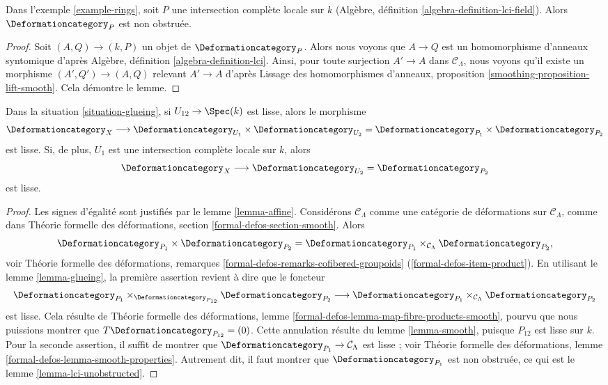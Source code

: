 \begin{lemma}
\label{lemma-lci-unobstructed}
Dans l'exemple \ref{example-rings}, soit $P$ une intersection complète
locale sur $k$ (Algèbre, définition \ref{algebra-definition-lci-field}).
Alors $\Deformationcategory_P$ est non obstruée.
\end{lemma}

\begin{proof}
Soit $(A, Q) \to (k, P)$ un objet de $\Deformationcategory_P$.
Alors nous voyons que $A \to Q$ est un homomorphisme d'anneaux syntomique d'après
Algèbre, définition \ref{algebra-definition-lci}.
Ainsi, pour toute surjection $A' \to A$ dans $\mathcal{C}_\Lambda$,
nous voyons qu'il existe un morphisme $(A', Q') \to (A, Q)$
relevant $A' \to A$ d'après
Lissage des homomorphismes d'anneaux, proposition \ref{smoothing-proposition-lift-smooth}.
Cela démontre le lemme.
\end{proof}

\begin{lemma}
\label{lemma-glueing-smooth}
Dans la situation \ref{situation-glueing}, si $U_{12} \to \Spec(k)$ est lisse,
alors le morphisme
$$
\Deformationcategory_X
\longrightarrow
\Deformationcategory_{U_1} \times \Deformationcategory_{U_2} =
\Deformationcategory_{P_1} \times \Deformationcategory_{P_2}
$$
est lisse. Si, de plus,
$U_1$ est une intersection complète locale sur $k$, alors
$$
\Deformationcategory_X
\longrightarrow
\Deformationcategory_{U_2} = \Deformationcategory_{P_2}
$$
est lisse.
\end{lemma}

\begin{proof}
Les signes d'égalité sont justifiés par le lemme \ref{lemma-affine}.
Considérons $\mathcal{C}_\Lambda$ comme une catégorie de
déformations sur $\mathcal{C}_\Lambda$, comme dans
Théorie formelle des déformations, section \ref{formal-defos-section-smooth}.
Alors
$$
\Deformationcategory_{P_1} \times \Deformationcategory_{P_2} =
\Deformationcategory_{P_1}
\times_{\mathcal{C}_\Lambda}
\Deformationcategory_{P_2},
$$
voir Théorie formelle des déformations, remarques
\ref{formal-defos-remarks-cofibered-groupoids}
(\ref{formal-defos-item-product}).
En utilisant le
lemme \ref{lemma-glueing},
la première assertion revient à dire que le foncteur
$$
\Deformationcategory_{P_1}
\times_{\Deformationcategory_{P_{12}}}
\Deformationcategory_{P_2}
\longrightarrow
\Deformationcategory_{P_1}
\times_{\mathcal{C}_\Lambda}
\Deformationcategory_{P_2}
$$
est lisse. Cela résulte de Théorie formelle des déformations, lemme
\ref{formal-defos-lemma-map-fibre-products-smooth}, pourvu que
nous puissions montrer que $T\Deformationcategory_{P_{12}} = (0)$.
Cette annulation résulte du lemme \ref{lemma-smooth},
puisque $P_{12}$ est lisse sur $k$.
Pour la seconde assertion, il suffit de montrer que
$\Deformationcategory_{P_1} \to \mathcal{C}_\Lambda$
est lisse ; voir Théorie formelle des déformations, lemme
\ref{formal-defos-lemma-smooth-properties}.
Autrement dit, il faut montrer que $\Deformationcategory_{P_1}$
est non obstruée, ce qui est le lemme \ref{lemma-lci-unobstructed}.
\end{proof}

